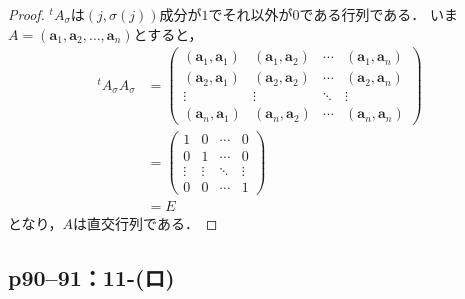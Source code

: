 \documentclass[a4paper,10pt,fleqn]{ltjsarticle}
\begin{document}
\begin{tleftbar}
  \begin{proof}
    ${}^t A_\sigma$は$(j,\sigma(j))$成分が$1$でそれ以外が$0$である行列である．
    いま$A = (\bm{a}_1,\bm{a}_2,\ldots,\bm{a}_n)$とすると，
    \begin{align*}
      {}^t A_\sigma A_\sigma & =
      \begin{pmatrix}
        (\bm{a}_1,\bm{a}_1) & (\bm{a}_1,\bm{a}_2) & \cdots & (\bm{a}_1,\bm{a}_n) \\
        (\bm{a}_2,\bm{a}_1) & (\bm{a}_2,\bm{a}_2) & \cdots & (\bm{a}_2,\bm{a}_n) \\
        \vdots              & \vdots              & \ddots & \vdots              \\
        (\bm{a}_n,\bm{a}_1) & (\bm{a}_n,\bm{a}_2) & \cdots & (\bm{a}_n,\bm{a}_n)
      \end{pmatrix}
      \\
                             & = \begin{pmatrix} 1 & 0 & \cdots & 0 \\ 0 & 1 & \cdots & 0 \\ \vdots & \vdots & \ddots & \vdots \\ 0 & 0 & \cdots & 1 \end{pmatrix} \\
                             & = E
    \end{align*}
    となり，$A$は直交行列である．
  \end{proof}
\end{tleftbar}

\subsection*{p90--91：11-(ロ)}
\end{document}
